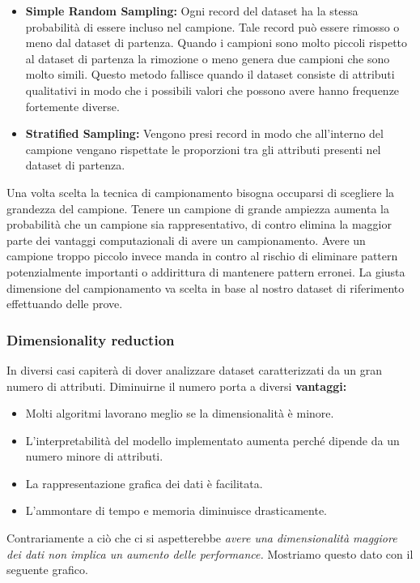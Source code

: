 \begin{itemize}
	\item \textbf{Simple Random Sampling:} Ogni record del dataset ha la stessa probabilità di essere incluso nel campione. Tale record può essere rimosso o meno dal dataset di partenza. Quando i campioni sono molto piccoli rispetto al dataset di partenza la rimozione o meno genera due campioni che sono molto simili.	
	Questo metodo fallisce quando il dataset consiste di attributi qualitativi in modo che i possibili valori che possono avere hanno frequenze fortemente diverse.
	
	\item \textbf{Stratified Sampling:} Vengono presi record in modo che all'interno del campione vengano rispettate le proporzioni tra gli attributi presenti nel dataset di partenza.
\end{itemize}

Una volta scelta la tecnica di campionamento bisogna occuparsi di scegliere la grandezza del campione. Tenere un campione di grande ampiezza aumenta la probabilità che un campione sia rappresentativo, di contro elimina la maggior parte dei vantaggi computazionali di avere un campionamento. Avere un campione troppo piccolo invece manda in contro al rischio di eliminare pattern potenzialmente importanti o addirittura di mantenere pattern erronei. La giusta dimensione del campionamento va scelta in base al nostro dataset di riferimento effettuando delle prove.

\subsubsection{Dimensionality reduction}

In diversi casi capiterà di dover analizzare dataset caratterizzati da un gran numero di attributi. Diminuirne il numero porta a diversi \textbf{vantaggi:}

\begin{itemize}
	\item Molti algoritmi lavorano meglio se la dimensionalità è minore.
	\item L'interpretabilità del modello implementato aumenta perché dipende da un numero minore di attributi.
	\item La rappresentazione grafica dei dati è facilitata.
	\item L'ammontare di tempo e memoria diminuisce drasticamente.
\end{itemize}

Contrariamente a ciò che ci si aspetterebbe \textit{avere una dimensionalità maggiore dei dati non implica un aumento delle performance.}
Mostriamo questo dato con il seguente grafico.

